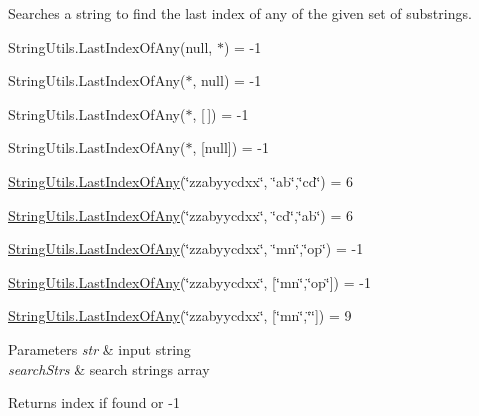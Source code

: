 Searches a string to find the last index of any of the given set of substrings. 

String\+Utils.\+Last\+Index\+Of\+Any(null, $\ast$) = -\/1 

String\+Utils.\+Last\+Index\+Of\+Any($\ast$, null) = -\/1 

String\+Utils.\+Last\+Index\+Of\+Any($\ast$, \mbox{[}$\,$\mbox{]}) = -\/1 

String\+Utils.\+Last\+Index\+Of\+Any($\ast$, \mbox{[}null\mbox{]}) = -\/1 

\hyperlink{class_ultimate_1_1_utilities_1_1_string_utils_a3cb9c5e21faa29ecabb09534fa38c0b0}{String\+Utils.\+Last\+Index\+Of\+Any}(\char`\"{}zzabyycdxx\char`\"{}, \char`\"{}ab\char`\"{},\char`\"{}cd\char`\"{}) = 6 

\hyperlink{class_ultimate_1_1_utilities_1_1_string_utils_a3cb9c5e21faa29ecabb09534fa38c0b0}{String\+Utils.\+Last\+Index\+Of\+Any}(\char`\"{}zzabyycdxx\char`\"{}, \char`\"{}cd\char`\"{},\char`\"{}ab\char`\"{}) = 6 

\hyperlink{class_ultimate_1_1_utilities_1_1_string_utils_a3cb9c5e21faa29ecabb09534fa38c0b0}{String\+Utils.\+Last\+Index\+Of\+Any}(\char`\"{}zzabyycdxx\char`\"{}, \char`\"{}mn\char`\"{},\char`\"{}op\char`\"{}) = -\/1 

\hyperlink{class_ultimate_1_1_utilities_1_1_string_utils_a3cb9c5e21faa29ecabb09534fa38c0b0}{String\+Utils.\+Last\+Index\+Of\+Any}(\char`\"{}zzabyycdxx\char`\"{}, \mbox{[}\char`\"{}mn\char`\"{},\char`\"{}op\char`\"{}\mbox{]}) = -\/1 

\hyperlink{class_ultimate_1_1_utilities_1_1_string_utils_a3cb9c5e21faa29ecabb09534fa38c0b0}{String\+Utils.\+Last\+Index\+Of\+Any}(\char`\"{}zzabyycdxx\char`\"{}, \mbox{[}\char`\"{}mn\char`\"{},\char`\"{}\char`\"{}\mbox{]}) = 9 


\begin{DoxyParams}{Parameters}
{\em str} & input string\\
\hline
{\em search\+Strs} & search strings array\\
\hline
\end{DoxyParams}
\begin{DoxyReturn}{Returns}
index if found or -\/1
\end{DoxyReturn}
